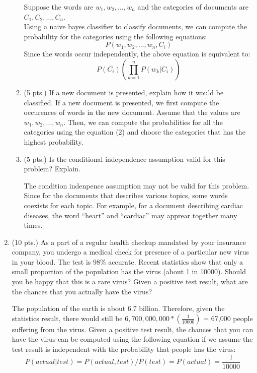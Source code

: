 \documentclass{article}%
\begin{document}
\begin{enumerate}
\begin{enumerate}
  		Suppose the words are $w_1, w_2, \ldots, w_n$ and the categories of documents are $C_1, C_2, \ldots, C_n$.\\
  		Using a naive bayes classifier to classify documents, we can compute the probability for the categories using the following equations:
  		\begin{equation} P(w_1, w_2, \ldots, w_n, C_i) \end{equation}
  		Since the words occur independently, the above equation is equivalent to:
  		\begin{equation} P(C_i) ( \prod_{k=1}^{n}P(w_k|C_i)) \end{equation}
  		
  		
  		\item (5 pts.) If a new document is presented, explain how it would be classified.
  		If a new document is presented, we first compute the occurences of words in the new document. Assume that the values are $w_1, w_2, \ldots, w_n$. Then, we can compute the probabilities for all the categories using the equation (2) and choose the categories that has the highest probability.
  		
		\item (5 pts.) Is the conditional independence assumption valid for this problem? Explain. 
		
		The condition indenpence assumption may not be valid for this problem. Since for the documents that describes various topics, some words coexists for each topic. For example, for a document describing cardiac diseases, the word ``heart'' and ``cardiac'' may apprear together many times. 
	\end{enumerate}

\item (10 pts.) As a part of a regular health checkup mandated by your insurance company, you undergo a medical check for presence of a particular new virus in your blood. The test is 98\% accurate. Recent statistics show that only a small proportion of the population has the virus (about 1 in 10000). Should you be happy that this is a rare virus? Given a positive test result, what are the chances that you actually have the virus? 

	The population of the earth is about 6.7 billion. Therefore, given the statistics result, there would still be $6,700,000,000 * (\frac{1}{10000})$ =  67,000 people suffering from the virus. Given a positive test result, the chances that you can have the virus can be computed using the following equation if we assume the test result is independent with the probability that people has the virus: 
	\[
	P(actual | test) = P(actual,test)/P(test) = P(actual) = \frac{1}{10000}
	\]



\end{enumerate}
\end{document}
